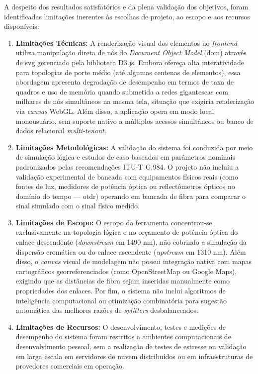 A despeito dos resultados satisfatórios e da plena validação dos objetivos, foram identificadas limitações inerentes às escolhas de projeto, ao escopo e aos recursos disponíveis:

\begin{enumerate}
    \item \textbf{Limitações Técnicas:} A renderização visual dos elementos no \textit{frontend} utiliza manipulação direta de nós do \textit{Document Object Model} (\gls{dom}) através de \gls{svg} gerenciado pela biblioteca D3.js. Embora ofereça alta interatividade para topologias de porte médio (até algumas centenas de elementos), essa abordagem apresenta degradação de desempenho em termos de taxa de quadros e uso de memória quando submetida a redes gigantescas com milhares de nós simultâneos na mesma tela, situação que exigiria renderização via \textit{canvas} WebGL. Além disso, a aplicação opera em modo local monousuário, sem suporte nativo a múltiplos acessos simultâneos ou banco de dados relacional \textit{multi-tenant}.
    
    \item \textbf{Limitações Metodológicas:} A validação do sistema foi conduzida por meio de simulação lógica e estudos de caso baseados em parâmetros nominais padronizados pelas recomendações ITU-T G.984. O projeto não incluiu a validação experimental de bancada com equipamentos físicos reais (como fontes de luz, medidores de potência óptica ou reflectômetros ópticos no domínio do tempo — \gls{otdr}) operando em bancada de fibra para comparar o sinal simulado com o sinal físico medido.
    
    \item \textbf{Limitações de Escopo:} O escopo da ferramenta concentrou-se exclusivamente na topologia lógica e no orçamento de potência óptica do enlace descendente (\textit{downstream} em 1490 nm), não cobrindo a simulação da dispersão cromática ou do enlace ascendente (\textit{upstream} em 1310 nm). Além disso, o \textit{canvas} visual de modelagem não possui integração nativa com mapas cartográficos georreferenciados (como OpenStreetMap ou Google Maps), exigindo que as distâncias de fibra sejam inseridas manualmente como propriedades dos enlaces. Por fim, o sistema não inclui algoritmos de inteligência computacional ou otimização combinatória para sugestão automática das melhores razões de \textit{splitters} desbalanceados.
    
    \item \textbf{Limitações de Recursos:} O desenvolvimento, testes e medições de desempenho do sistema foram restritos a ambientes computacionais de desenvolvimento pessoal, sem a realização de testes de estresse ou validação em larga escala em servidores de nuvem distribuídos ou em infraestruturas de provedores comerciais em operação.
\end{enumerate}

